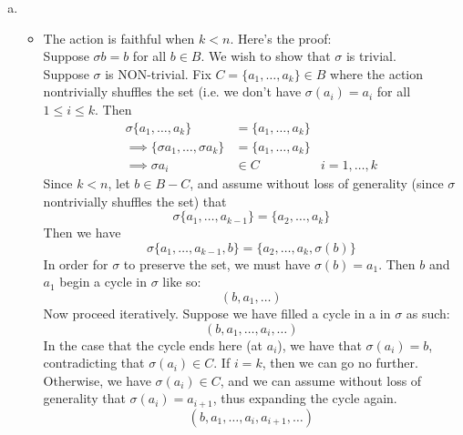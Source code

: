 \documentclass{article}
\newcommand{\set}[1]{ \{ #1 \} }
\begin{document}
\subsubsection{}\label{ex7p10}
\begin{enumerate}[(a)]
\item 
\begin{itemize}

\item The action is faithful when $k<n$. Here's the proof:\\
Suppose $\sigma b = b$ for all $b \in B$. We wish to show that $\sigma$ is trivial.\\
Suppose $\sigma$ is NON-trivial. Fix $C=\set{a_1,\ldots,a_k}\in B$ where the action nontrivially shuffles the set (i.e. we don't have $\sigma(a_i)=a_i$ for all $1\leq i\leq k$. Then  
\begin{align*}
\sigma\set{a_1,\ldots,a_k} &= \set{a_1,\ldots,a_k}\\
\implies\set{\sigma{a_1},\ldots,\sigma{a_k}} &= \set{a_1,\ldots,a_k}\\
\implies \sigma{a_i} &\in C & i=1,\ldots,k
\end{align*}
Since $k<n$, let $b \in B - C$, and assume without loss of generality (since $\sigma$ nontrivially shuffles the set) that
\begin{equation}
\sigma\set{a_1,\ldots,a_{k-1}} = \set{a_2,\ldots,a_k}
\end{equation}
Then we have
\begin{equation}
\sigma\set{a_1,\ldots,a_{k-1},b} = \set{a_2,\ldots,a_k,\sigma(b)}
\end{equation}
In order for $\sigma$ to preserve the set, we must have $\sigma(b)=a_1$. Then $b$ and $a_1$ begin a cycle in $\sigma$ like so:
\begin{equation}
(b, a_1, \ldots)
\end{equation}
Now proceed iteratively. Suppose we have filled a cycle in a in $\sigma$ as such:
\begin{equation}
(b, a_1,\ldots,a_i,\ldots)
\end{equation}
In the case that the cycle ends here (at $a_i$), we have that $\sigma(a_i) = b$, contradicting that $\sigma(a_i)\in C$. If $i=k$, then we can go no further. Otherwise, we have $\sigma(a_i) \in C$, and we can assume without loss of generality that $\sigma(a_i)=a_{i+1}$, thus expanding the cycle again.
\begin{equation}
(b, a_1,\ldots,a_i,a_{i+1},\ldots)
\end{equation}

\end{itemize}
\end{enumerate}
\end{document}
